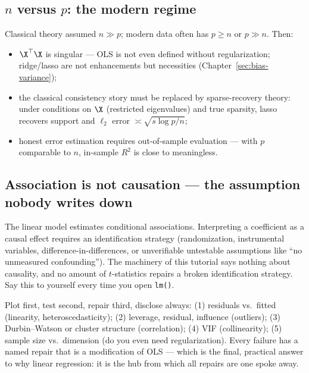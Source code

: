 \subsection{$n$ versus $p$: the modern regime}

Classical theory assumed $n \gg p$; modern data often has $p \geq n$ or $p \gg n$. Then:
\begin{itemize}
  \item $\X^\top\X$ is singular — OLS is not even defined without regularization; ridge/lasso are not enhancements but necessities (Chapter~\ref{sec:bias-variance});
  \item the classical consistency story must be replaced by sparse-recovery theory: under conditions on $\X$ (restricted eigenvalues) and true sparsity, lasso recovers support and $\ell_2$ error $\asymp \sqrt{s \log p / n}$;
  \item honest error estimation requires out-of-sample evaluation — with $p$ comparable to $n$, in-sample $R^2$ is close to meaningless.
\end{itemize}

\subsection{Association is not causation — the assumption nobody writes down}

The linear model estimates conditional associations. Interpreting a coefficient as a causal effect requires an identification strategy (randomization, instrumental variables, difference-in-differences, or unverifiable untestable assumptions like ``no unmeasured confounding''). The machinery of this tutorial says nothing about causality, and no amount of $t$-statistics repairs a broken identification strategy. Say this to yourself every time you open \texttt{lm()}.

\begin{keybox}
Plot first, test second, repair third, disclose always: (1) residuals vs.\ fitted (linearity, heteroscedasticity); (2) leverage, residual, influence (outliers); (3) Durbin--Watson or cluster structure (correlation); (4) VIF (collinearity); (5) sample size vs.\ dimension (do you even need regularization). Every failure has a named repair that is a modification of OLS — which is the final, practical answer to why linear regression: it is the hub from which all repairs are one spoke away.
\end{keybox}
